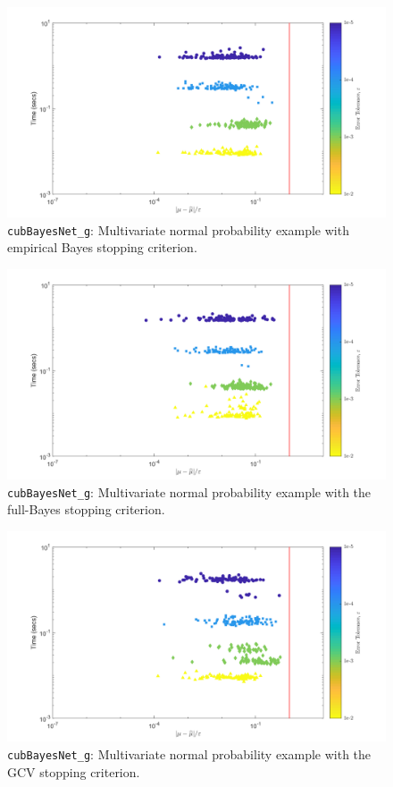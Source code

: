 \documentclass{iitthesis}          %
\newcommand{\code}[1]{\texttt{#1}}
\begin{document}
{{{{{{\begin{figure}
	\centering
	\includegraphics[width=0.95\linewidth]{"Sobol_MVN_guaranteed_time_MLE__d2_r1_2019-Jun-8"}
	\caption[Sobol: MVN guaranteed:MLE]{\code{cubBayesNet\_g}: Multivariate normal probability example with empirical Bayes stopping criterion.}
	\label{fig:Sobol-mvn-guaranteed-MLE}
\end{figure}
\begin{figure}
	\centering
	\includegraphics[width=0.95\linewidth]{"Sobol_MVN_guaranteed_time_full__d2_r1_2019-Jun-9"}
	\caption[Sobol: MVN guaranteed:Full Bayes]{\code{cubBayesNet\_g}: Multivariate normal probability example with the full-Bayes stopping criterion.}
	\label{fig:Sobol-mvn-guaranteed-FB}
\end{figure}
\begin{figure}
	\centering
	\includegraphics[width=0.95\linewidth]{"Sobol_MVN_guaranteed_time_GCV__d2_r1_2019-Jun-9"}
	\caption[Sobol: MVN guaranteed:GCV]{\code{cubBayesNet\_g}: Multivariate normal probability example with the GCV stopping criterion.}
	\label{fig:Sobol-mvn-guaranteed-GCV}
\end{figure}


}}}}}}
\end{document}

